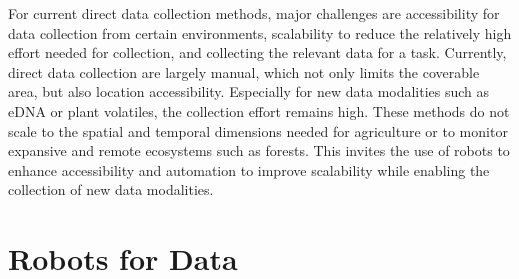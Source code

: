 For current direct data collection methods, major challenges are accessibility for data collection from certain environments, scalability to reduce the relatively high effort needed for collection, and collecting the relevant data for a task.
Currently, direct data collection are largely manual, which not only limits the coverable area, but also location accessibility. Especially for new data modalities such as eDNA or plant volatiles, the collection effort remains high. These methods do not scale to the spatial and temporal dimensions needed for agriculture or to monitor expansive and remote ecosystems such as forests. This invites the use of robots to enhance accessibility and automation to improve scalability while enabling the collection of new data modalities. %

\section{Robots for Data}

